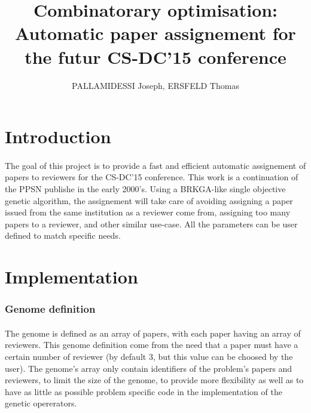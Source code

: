 \documentclass{article}
\begin{document}
  
  \title{Combinatorary optimisation: \\
    \large Automatic paper assignement for the futur CS-DC'15 conference}
  \author{PALLAMIDESSI Joseph, ERSFELD Thomas}
  \maketitle
  
  \section{Introduction} %
  \label{sec:Intr}
    \paragraph{} %
    \label{par:}
    The goal of this project is to provide a fast and efficient automatic
    assignement of papers to reviewers for the CS-DC'15 conference. 
    This work is a continuation of the PPSN\cite{} publishe in the early 2000's. 
    Using a BRKGA\cite{}-like single objective genetic algorithm, the assignement will
    take care of avoiding assigning a paper issued from the same institution as a
    reviewer come from, assigning too many papers to a reviewer, and other similar
    use-case. All the parameters can be user defined to match specific needs. 


  \section{Implementation} %
  \label{sec:Implementation}
    \subsubsection{Genome definition} %
    \label{ssub:Genome definition}
      
      \paragraph{} %
      \label{par:}
        The genome is defined as an array of papers, with each paper having an array of
        reviewers. This genome definition come from the need that a paper must have a
        certain number of reviewer (by default 3, but this value can be choosed by
        the user). The genome's array only contain identifiers of the problem's
        papers and reviewers, to limit the size of the genome, to provide more
        flexibility as well as to have as little as possible problem specific code
        in the implementation of the genetic opererators.
      
\end{document}
